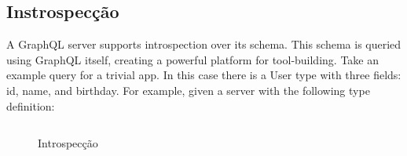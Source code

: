 \subsection[Instrospecção]{Instrospecção}

A GraphQL server supports introspection over its schema. This schema is queried using GraphQL itself, creating a powerful platform for tool‐building. Take an example query for a trivial app. In this case there is a User type with three fields: id, name, and birthday. For example, given a server with the following type definition:

\begin{figure}[H]
  \centering
  \inputminted[frame=single,framesep=10pt]{javascript}{anexos/graphql-introspection.txt}
  \caption{Introspecção}
\end{figure}
